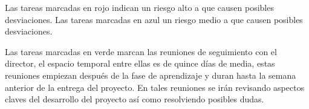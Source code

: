 Las tareas marcadas en rojo indican un riesgo alto a que causen posibles desviaciones.
Las tareas marcadas en azul un riesgo medio a que causen posibles desviaciones.

Las tareas marcadas en verde marcan las reuniones de seguimiento con el director, el espacio temporal entre ellas es de quince días de media, estas reuniones empiezan después de la fase de aprendizaje y duran hasta la semana anterior de la entrega del proyecto. En tales reuniones se irán revisando aspectos claves del desarrollo del proyecto así como resolviendo posibles dudas.







